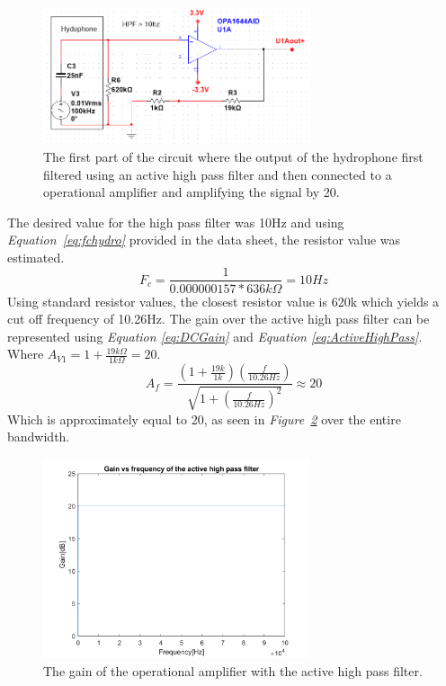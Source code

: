 \begin{figure}[h]
    \centering
    \includegraphics[width=0.70\textwidth]{graphics/OPamp1.png}
    \caption{The first part of the circuit where the output of the hydrophone first filtered using an active high pass filter and then connected to a operational amplifier and amplifying the signal by 20.}
    \label{fig:Opamp1}
\end{figure}


The desired value for the high pass filter was 10Hz and using \textit{Equation~\ref{eq:fchydro}} provided in the data sheet, the resistor value was estimated.   
$$F_c = \frac{1}{0.000000157 * 636k\Omega} = 10Hz$$
Using standard resistor values, the closest resistor value is 620k which yields a cut off frequency of 10.26Hz.
The gain over the active high pass filter can be represented using \textit{Equation \ref{eq:DCGain}} and \textit{Equation \ref{eq:ActiveHighPass}}. 
Where $A_{V1} = 1 + \frac{19k\Omega}{1k\Omega} = 20$.
$$A_f = \frac{(1+\frac{19k}{1k})(\frac{f}{10.26Hz})}{\sqrt{1 + (\frac{f}{10.26Hz})^2}} \approx 20$$
Which is approximately equal to 20, as seen in \textit{Figure~\ref{fig:AVhighpass}} over the entire bandwidth.

\begin{figure}[h]
    \centering
    \includegraphics[width=0.7\textwidth]{graphics/Av_Highpass.png}
    \caption{The gain of the operational amplifier with the active high pass filter.}
    \label{fig:AVhighpass}
\end{figure}

